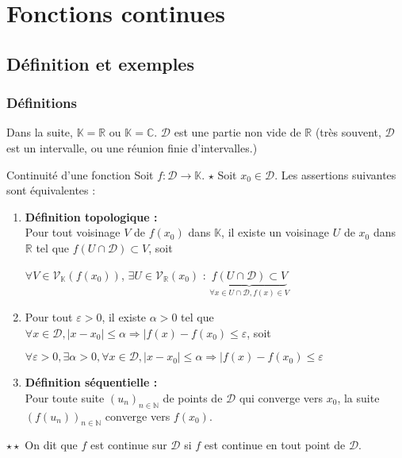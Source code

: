 \documentclass[12pt,a4paper]{report}
\begin{document}
\chapter{Fonctions continues}

\section{Définition et exemples}
\subsection{Définitions}

Dans la suite, $\mathbb{K} = \mathbb{R}$ ou $\mathbb{K} = \mathbb{C}$.  $\mathcal{D}$ est une partie non vide de $\mathbb{R}$ (très souvent, $\mathcal{D}$ est un intervalle, ou une réunion finie d'intervalles.)

\begin{definition}{Continuité d'une fonction}{}
Soit $f : \mathcal{D} \rightarrow \mathbb{K}$. \newline
$\star$ Soit $x_0 \in \mathcal{D}$. Les assertions suivantes sont équivalentes : 
\begin{enumerate}
\item \textbf{Définition topologique :} \\Pour tout voisinage $V$ de $f(x_0)$ dans $\mathbb{K}$, il existe un voisinage $U$ de $x_0$ dans $\mathbb{R}$ tel que $f(U \cap \mathcal{D}) \subset V$, soit
\begin{center}
    $\forall V \in \mathcal{V}_\mathbb{K}(f(x_0))$, $\exists U \in \mathcal{V}_\mathbb{R}(x_0)$ : $\underbrace{f(U \cap \mathcal{D}) \subset V}_{\forall x \in U\cap \mathcal{D}, f(x) \in V}$ 
\end{center}


\item Pour tout $\varepsilon > 0$, il existe $\alpha > 0$ tel que
\newline $\forall x \in \mathcal{D}, \lvert x-x_0 \rvert \leq \alpha \Longrightarrow \lvert f(x)-f(x_0) \leq \varepsilon$, soit
\begin{center}
    $\forall \varepsilon > 0, \exists \alpha > 0, \forall x \in \mathcal{D}, \lvert x-x_0 \rvert \leq \alpha \Longrightarrow \lvert f(x)-f(x_0) \leq \varepsilon$
\end{center}


\item \textbf{Définition séquentielle :} \\Pour toute suite $(u_n)_{n \in \mathbb{N}}$ de points de $\mathcal{D}$ qui converge vers $x_0$, la suite $(f(u_n))_{n \in \mathbb{N}}$ converge vers $f(x_0)$.

\end{enumerate}


\noindent $\star \star$ On dit que $f$ est continue sur $\mathcal{D}$ si $f$ est continue en tout point de $\mathcal{D}.$
\end{definition}
\end{document}
